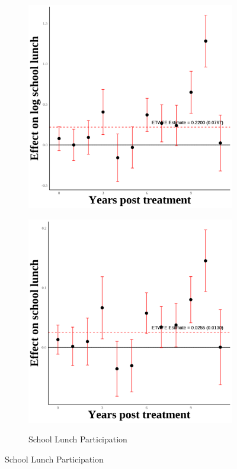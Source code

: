 \documentclass[12pt,english]{article}
\begin{document}
\begin{figure}[H]
\begin{subfigure}[b]{0.3\textwidth}
    \includegraphics[width=\linewidth]{figures/plot82-ln_schl_lunch_event_study-third-four.png}
    \label{fig:ln-schl-lunch-third-four}
  \end{subfigure}
  \hfill
  \begin{subfigure}[b]{0.3\textwidth}
    \centering
    \caption{School Lunch Participation}
    \includegraphics[width=\linewidth]{figures/plot83-schl_lunch_event_study-third-four.png}
    \label{fig:schl-lunch-third-four}
  \end{subfigure}


\end{figure}
\end{document}

